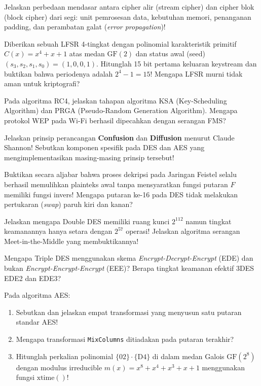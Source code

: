 \documentclass[main.tex]{subfiles}
\begin{document}
\begin{latihan}
  \item Jelaskan perbedaan mendasar antara cipher alir (stream cipher) dan cipher blok (block cipher) dari segi: unit pemrosesan data, kebutuhan memori, penanganan padding, dan perambatan galat (\textit{error propagation})!

  \item Diberikan sebuah LFSR 4-tingkat dengan polinomial karakteristik primitif $C(x) = x^4 + x + 1$ atas medan $\mathrm{GF}(2)$ dan status awal (seed) $(s_3, s_2, s_1, s_0) = (1, 0, 0, 1)$. Hitunglah 15 bit pertama keluaran keystream dan buktikan bahwa periodenya adalah $2^4 - 1 = 15$! Mengapa LFSR murni tidak aman untuk kriptografi?

  \item Pada algoritma RC4, jelaskan tahapan algoritma KSA (Key-Scheduling Algorithm) dan PRGA (Pseudo-Random Generation Algorithm). Mengapa protokol WEP pada Wi-Fi berhasil dipecahkan dengan serangan FMS?

  \item Jelaskan prinsip perancangan \textbf{Confusion} dan \textbf{Diffusion} menurut Claude Shannon! Sebutkan komponen spesifik pada DES dan AES yang mengimplementasikan masing-masing prinsip tersebut!

  \item Buktikan secara aljabar bahwa proses dekripsi pada Jaringan Feistel selalu berhasil memulihkan plainteks awal tanpa mensyaratkan fungsi putaran $F$ memiliki fungsi invers! Mengapa putaran ke-16 pada DES tidak melakukan pertukaran (\textit{swap}) paruh kiri dan kanan?

  \item Jelaskan mengapa Double DES memiliki ruang kunci $2^{112}$ namun tingkat keamanannya hanya setara dengan $2^{57}$ operasi! Jelaskan algoritma serangan Meet-in-the-Middle yang membuktikannya!

  \item Mengapa Triple DES menggunakan skema \textit{Encrypt-Decrypt-Encrypt} (EDE) dan bukan \textit{Encrypt-Encrypt-Encrypt} (EEE)? Berapa tingkat keamanan efektif 3DES EDE2 dan EDE3?

  \item Pada algoritma AES:
  \begin{enumerate}
    \item Sebutkan dan jelaskan empat transformasi yang menyusun satu putaran standar AES!
    \item Mengapa transformasi \texttt{MixColumns} ditiadakan pada putaran terakhir?
    \item Hitunglah perkalian polinomial $\{02\} \cdot \{\text{D}4\}$ di dalam medan Galois $\mathrm{GF}(2^8)$ dengan modulus irreducible $m(x) = x^8 + x^4 + x^3 + x + 1$ menggunakan fungsi $\mathrm{xtime}()$!
  \end{enumerate}


\end{latihan}
\end{document}
